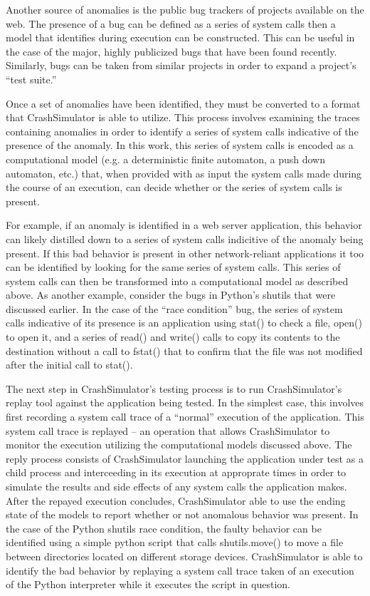     Another source of anomalies is the public bug trackers of projects available on the web.  The presence of a bug can
    be defined as a series of system calls then a model that identifies during execution can be constructed.  This can
    be useful in the case of the major, highly publicized bugs that have been found recently.  Similarly, bugs can be
    taken from similar projects in order to expand a project's ``test suite.''

    Once a set of anomalies have been identified, they must be converted to a format that CrashSimulator is able to
    utilize.  This process involves examining the traces containing anomalies in order to identify a series of system
    calls indicative of the presence of the anomaly.  In this work, this series of system calls is encoded as a
    computational model (e.g. a deterministic finite automaton, a push down automaton, etc.) that, when provided with as
    input the system calls made during the course of an execution, can decide whether or the series of system calls is
    present.

    For example, if an anomaly is identified in a web server application, this behavior can likely distilled down to a
    series of system calls indicitive of the anomaly being present.  If this bad behavior is present in other
    network-reliant applications it too can be identified by looking for the same series of system calls.  This series
    of system calls can then be transformed into a computational model as described above.  As another example, consider
    the bugs in Python's shutils that were discussed earlier.  In the case of the ``race condition'' bug, the series of
    system calls indicative of its presence is an application using stat() to check a file, open() to open it, and a
    series of read() and write() calls to copy its contents to the destination without a call to fstat() that to confirm
    that the file was not modified after the initial call to stat().

    The next step in CrashSimulator's testing process is to run CrashSimulator's replay tool against the application
    being tested.  In the simplest case, this involves first recording a system call trace of a ``normal'' execution of
    the application.  This system call trace is replayed -- an operation that allows CrashSimulator to monitor the
    execution utilizing the computational models discussed above.  The reply process consists of CrashSimulator
    launching the application under test as a child process and interceeding in its execution at approprate times in
    order to simulate the results and side effects of any system calls the application makes.  After the repayed
    execution concludes, CrashSimulator able to use the ending state of the models to report whether or not anomalous
    behavior was present.  In the case of the Python shutils race condition, the faulty behavior can be identified using
    a simple python script that calls shutils.move() to move a file between directories located on different storage
    devices.  CrashSimulator is able to identify the bad behavior by replaying a system call trace taken of an
    execution of the Python interpreter while it executes the script in question.

